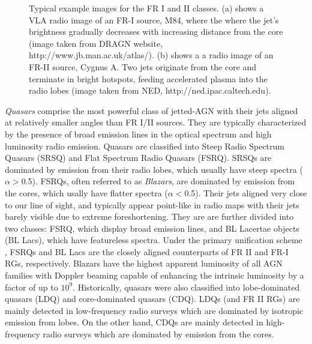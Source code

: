 \begin{figure}
    \caption{Typical example images for the FR I and II classes. (a) shows a VLA radio image of an FR-I source, M84, where the where the jet's brightness gradually decreases with increasing distance from the core (image taken from DRAGN website, http://www.jb.man.ac.uk/atlas/). (b) shows a a radio image of an FR-II source, Cygnus A. Two jets originate from the core and terminate in bright hotspots, feeding accelerated plasma into the radio lobes (image taken from NED, http://ned.ipac.caltech.edu).\label{fig:FR_I_II} }
\end{figure}

\textit{Quasars} comprise the most powerful class of jetted-AGN with their jets aligned at relatively smaller angles than FR I/II sources. They are typically characterized by the presence of broad emission lines in the optical spectrum and high luminosity radio emission. Quasars are classified into Steep Radio Spectrum Quasars (SRSQ) and Flat Spectrum Radio Quasars (FSRQ). SRSQs are dominated by emission from their radio lobes, which usually have steep spectra ($\alpha>$0.5). FSRQs,  often referred to as \textit{Blazars}, are dominated by emission from the cores, which usally have flatter spectra ($\alpha<$0.5). Their jets aligned very close to our line of sight, and typically appear point-like in radio maps with their jets barely visible due to extreme foreshortening. They are are further divided into two classes: FSRQ, which display broad emission lines, and BL Lacertae objects (BL Lacs), which have featureless spectra. Under the primary unification scheme 
\citep[e.g.,][]{urry1995unified}, FSRQs and BL Lacs are the closely aligned counterparts of FR II and FR-I RGs, respectively. Blazars have the highest apparent luminosity of all AGN families with Doppler beaming capable of enhancing the intrinsic luminosity by a factor of up to $10^9$. Historically, quasars were also classified into lobe-dominated quasars (LDQ) and core-dominated quasars (CDQ). LDQs (and FR II RGs) are mainly detected in low-frequency radio surveys which are dominated by isotropic emission from lobes. On the other hand, CDQs are mainly detected in high-frequency radio surveys which are dominated by emission from the cores. 

